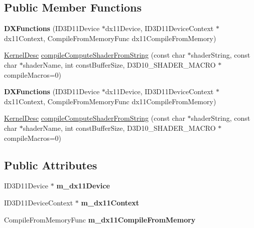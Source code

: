 \subsection*{Public Member Functions}
\begin{DoxyCompactItemize}
\item 
\mbox{\label{classDXFunctions_a028efb4de186d56954406136e50de228}} 
{\bfseries D\+X\+Functions} (I\+D3\+D11\+Device $\ast$dx11\+Device, I\+D3\+D11\+Device\+Context $\ast$dx11\+Context, Compile\+From\+Memory\+Func dx11\+Compile\+From\+Memory)
\item 
\hyperlink{classDXFunctions_1_1KernelDesc}{Kernel\+Desc} \hyperlink{classDXFunctions_a0e3bb1fe5f14fe6d31c91543242e9308}{compile\+Compute\+Shader\+From\+String} (const char $\ast$shader\+String, const char $\ast$shader\+Name, int const\+Buffer\+Size, D3\+D10\+\_\+\+S\+H\+A\+D\+E\+R\+\_\+\+M\+A\+C\+RO $\ast$compile\+Macros=0)
\item 
\mbox{\label{classDXFunctions_a028efb4de186d56954406136e50de228}} 
{\bfseries D\+X\+Functions} (I\+D3\+D11\+Device $\ast$dx11\+Device, I\+D3\+D11\+Device\+Context $\ast$dx11\+Context, Compile\+From\+Memory\+Func dx11\+Compile\+From\+Memory)
\item 
\hyperlink{classDXFunctions_1_1KernelDesc}{Kernel\+Desc} \hyperlink{classDXFunctions_a6375c595298f83e37ead99d33ffe0876}{compile\+Compute\+Shader\+From\+String} (const char $\ast$shader\+String, const char $\ast$shader\+Name, int const\+Buffer\+Size, D3\+D10\+\_\+\+S\+H\+A\+D\+E\+R\+\_\+\+M\+A\+C\+RO $\ast$compile\+Macros=0)
\end{DoxyCompactItemize}
\subsection*{Public Attributes}
\begin{DoxyCompactItemize}
\item 
\mbox{\label{classDXFunctions_af45385c83f78021377261e16681f8de9}} 
I\+D3\+D11\+Device $\ast$ {\bfseries m\+\_\+dx11\+Device}
\item 
\mbox{\label{classDXFunctions_a61b5a9eeb16cc6a1ddaba7dad167d01b}} 
I\+D3\+D11\+Device\+Context $\ast$ {\bfseries m\+\_\+dx11\+Context}
\item 
\mbox{\label{classDXFunctions_aa84bbf50bb6c73d89828b6e31e01f524}} 
Compile\+From\+Memory\+Func {\bfseries m\+\_\+dx11\+Compile\+From\+Memory}
\end{DoxyCompactItemize}


